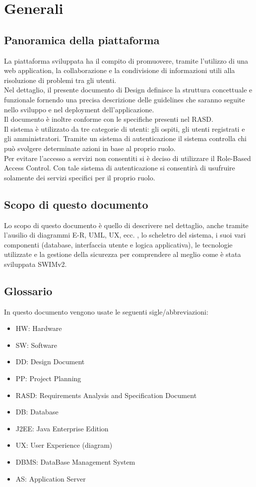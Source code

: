 \section{Generali}


\subsection{Panoramica della piattaforma}
La piattaforma sviluppata ha il compito di promuovere, tramite l’utilizzo di una web application, la collaborazione e la condivisione di informazioni utili alla risoluzione di problemi tra gli utenti.\\[1\baselineskip]Nel dettaglio, il presente documento di Design definisce la struttura concettuale e funzionale fornendo una precisa descrizione delle guidelines che saranno seguite nello sviluppo e nel deployment dell’applicazione.\\[1\baselineskip]Il documento è inoltre conforme con le specifiche presenti nel RASD.\\[1\baselineskip]Il sistema è utilizzato da tre categorie di utenti: gli ospiti, gli utenti registrati e gli amministratori. Tramite un sistema di autenticazione il sistema controlla chi può svolgere determinate azioni in base al proprio ruolo.\\[1\baselineskip]Per evitare l’accesso a servizi non consentiti si è deciso di utilizzare il Role-Based Access Control. Con tale sistema di autenticazione si consentirà di usufruire solamente dei servizi specifici per il proprio ruolo.


\subsection{Scopo di questo documento}
Lo scopo di questo documento è quello di descrivere nel dettaglio, anche tramite l'ausilio di diagrammi E-R, UML, UX, ecc. , lo scheletro del sistema, i suoi vari componenti (database,
interfaccia utente e logica applicativa), le tecnologie utilizzate e la gestione della sicurezza per comprendere al meglio come è stata sviluppata SWIMv2.

\subsection{Glossario}
In questo documento vengono usate le seguenti sigle/abbreviazioni:
\begin{itemize}
 \item HW: Hardware
 \item SW: Software
 \item DD: Design Document
 \item PP: Project Planning
 \item RASD: Requirements Analysis and Specification Document
 \item DB: Database
 \item J2EE: Java Enterprise Edition
 \item UX: User Experience (diagram)
 \item DBMS: DataBase Management System
 \item AS: Application Server
\end{itemize}

\pagebreak


